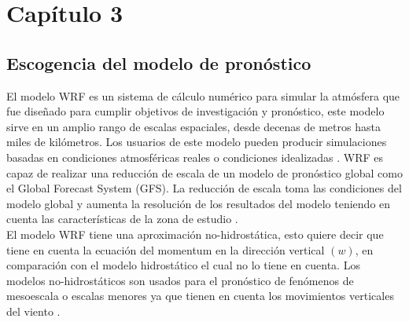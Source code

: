 \chapter{Capítulo 3}




\section{Escogencia del modelo de pronóstico}

El modelo WRF es un sistema de cálculo numérico para simular la atmósfera que fue diseñado para cumplir objetivos de investigación y pronóstico, este modelo sirve en un amplio rango de escalas espaciales, desde decenas de metros hasta miles de kilómetros. Los usuarios de este modelo pueden producir simulaciones basadas en condiciones atmosféricas reales o condiciones idealizadas \citep{Pielke2002}. WRF es capaz de realizar una reducción de escala de un modelo de pronóstico global como el Global Forecast System (GFS). La reducción de escala toma las condiciones del modelo global y aumenta la resolución de los resultados del modelo teniendo en cuenta las características de la zona de estudio \citep{Sene2010}.\\

El modelo WRF tiene una aproximación no-hidrostática, esto quiere decir que tiene en cuenta la ecuación del momentum en la dirección vertical $(w)$, en comparación con el modelo hidrostático el cual no lo tiene en cuenta. Los modelos no-hidrostáticos son usados para el pronóstico de fenómenos de mesoescala o escalas menores \citep{Pielke2002, Sene2010} ya que tienen en cuenta los movimientos verticales del viento \citep{ArmentaPorras2013}.\\

